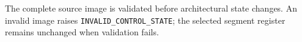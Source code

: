 The complete source image is validated before architectural state changes. An invalid image raises
\texttt{INVALID\_CONTROL\_STATE}; the selected segment register remains unchanged when validation fails.
